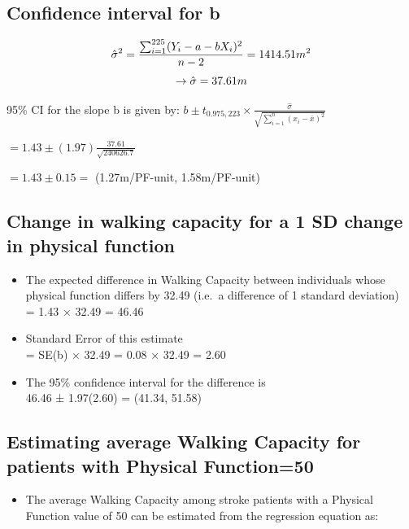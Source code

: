 \documentclass[
]{book}
\providecommand{\tightlist}{%
  \setlength{\itemsep}{0pt}\setlength{\parskip}{0pt}}
\begin{document}
\hypertarget{confidence-interval-for-b}{%
\subsection{Confidence interval for b}\label{confidence-interval-for-b}}

\[\hat{\sigma}^2=\frac{\sum_{i=1}^{225}(Y_i-a-bX_i)^2}{n-2}=1414.51\space m^2\]
\[\rightarrow \hat{\sigma}=37.61\space m\]

95\% CI for the slope b is given by: \(b\pm t_{0.975,223}\times\frac{\hat{\sigma}}{\sqrt{\sum_{i=1}^n(x_i-\bar x)^2}}\)

\(=1.43\pm(1.97)\frac{37.61}{\sqrt{240626.7}}\)

\(=1.43\pm0.15=\) (1.27m/PF-unit, 1.58m/PF-unit)

\hypertarget{change-in-walking-capacity-for-a-1-sd-change-in-physical-function}{%
\subsection{Change in walking capacity for a 1 SD change in physical function}\label{change-in-walking-capacity-for-a-1-sd-change-in-physical-function}}

\begin{itemize}
\tightlist
\item
  The expected difference in Walking Capacity between individuals whose physical function differs by 32.49 (i.e.~a difference of 1 standard deviation)\\
  = 1.43 × 32.49 = 46.46
\item
  Standard Error of this estimate\\
  = SE(b) × 32.49 = 0.08 × 32.49 = 2.60
\item
  The 95\% confidence interval for the difference is\\
  46.46 ± 1.97(2.60) = (41.34, 51.58)
\end{itemize}

\hypertarget{estimating-average-walking-capacity-for-patients-with-physical-function50}{%
\subsection{Estimating average Walking Capacity for patients with Physical Function=50}\label{estimating-average-walking-capacity-for-patients-with-physical-function50}}

\begin{itemize}
\tightlist
\item
  The average Walking Capacity among stroke patients with a Physical Function value of 50 can be estimated from the regression equation as:
\end{itemize}
\end{document}
